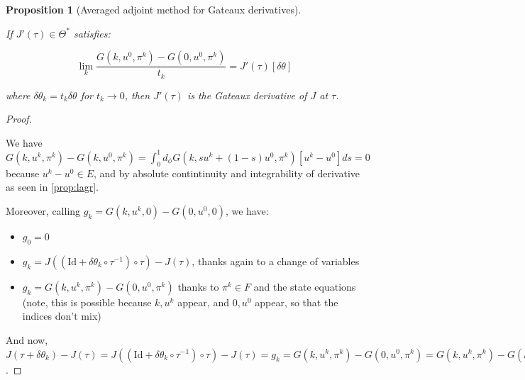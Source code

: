 \documentclass[english,a4paper,12pt,oneside]{scrbook}
\theoremstyle{break}
\newtheorem{prop}[equation]{Proposition}
\newenvironment{mproof}[1][\proofname]{%
  \begin{proof}[#1]$ $\par\nobreak\ignorespaces
}{%
  \end{proof}
}
\renewcommand*{\proofname}{Proof}
\theoremstyle{remark}
\newcommand{\id}{\text{Id}}
\newcommand{\te}{\theta}
\newcommand{\Te}{\Theta}
\begin{document}
\begin{prop}[Averaged adjoint method for Gateaux derivatives]
\label{prop:adv_adj}

If $J'(\tau) \in \Te^*$ satisfies:

$$\lim_{k}\frac{G(k,u^0,\pi^k)-G(0,u^0,\pi^k)}{t_k}=J'(\tau)[\delta \te]$$

where $\delta\te_k = t_k\delta \te$ for $t_k\rightarrow 0$, then $J'(\tau)$ is the Gateaux derivative of $J$ at $\tau$.

\end{prop}

\begin{mproof}

We have $G(k,u^k,\pi^k)-G(k,u^0,\pi^k)  = \int_0^1 d_\phi G(k, su^k + (1-s)u^0,\pi^k)[u^k-u^0]ds = 0$ because $u^k-u^0 \in E$, and by absolute contintinuity and integrability of derivative as seen in \cref{prop:lagr}.

Moreover, calling $g_k = G(k,u^k,0)-G(0,u^0,0)$, we have:

\begin{itemize}
	\item $g_0 = 0$
	\item $g_k = J((\id+\delta\te_k \circ \tau^{-1})\circ \tau)-J(\tau)$, thanks again to a change of variables
	\item $g_k = G(k,u^k,\pi^k)-G(0,u^0,\pi^k)$ thanks to $\pi^k \in F$ and the state equations (note, this is possible because $k,u^k$ appear, and $0,u^0$ appear, so that the indices don't mix)
\end{itemize}

And now, $J(\tau+\delta\te_k)-J(\tau) = J((\id+\delta\te_k \circ \tau^{-1})\circ \tau)-J(\tau) = g_k = G(k,u^k,\pi^k)-G(0,u^0,\pi^k) = G(k,u^k,\pi^k)-G(k,u^0,\pi^k)+G(k,u^0,\pi^k)-G(0,u^0,\pi^k) = G(k,u^0,\pi^k)-G(0,u^0,\pi^k)$.

\end{mproof}
\end{document}
